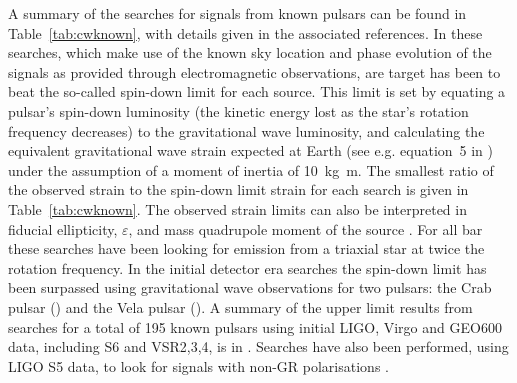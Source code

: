 A summary of the searches for signals from known pulsars can be found in Table~\ref{tab:cwknown}, with 
details given in the associated references. In these searches, which make use of the known sky location and 
phase evolution of the signals as provided through electromagnetic observations, are target has been to beat 
the so-called spin-down limit for each source. This limit is set by equating a pulsar's spin-down luminosity 
(the kinetic energy lost as the star's rotation frequency decreases) to the gravitational wave luminosity, 
and calculating the equivalent gravitational wave strain expected at Earth (see e.g. equation~5 in 
\cite{2014ApJ...785..119A}) under the assumption of a moment of inertia of 10~kg~m. The 
smallest ratio of the observed strain to the spin-down limit strain for each search is given in 
Table~\ref{tab:cwknown}. The observed strain limits can also be interpreted in fiducial ellipticity, 
$\varepsilon$, and mass quadrupole moment of the source \cite{2005PhRvL..95u1101O}. For all bar 
\cite{2015MNRAS.453.4399P} these searches have been looking for emission from a triaxial star at twice the 
rotation frequency. In the initial detector era searches the spin-down limit has been surpassed using 
gravitational wave observations for two pulsars: the Crab pulsar \cite{Abbott:2008j} 
() and the Vela pulsar \cite{Abadie:2011b} (). A 
summary of the upper limit results from searches for a total of 195 known pulsars using initial LIGO, Virgo 
and GEO600 data, including S6 and VSR2,3,4, is in \cite{2014ApJ...785..119A}. Searches have also been 
performed, using LIGO S5 data, to look for signals with non-GR polarisations \cite{2015PhRvD..91h2002I}.

